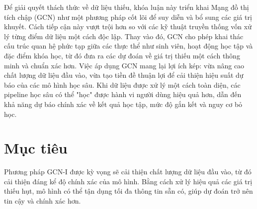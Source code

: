 Để giải quyết thách thức về dữ liệu thiếu, khóa luận này triển khai Mạng đồ thị tích chập (GCN) như một phương pháp cốt lõi để suy diễn và bổ sung các giá trị khuyết. Cách tiếp cận này vượt trội hơn so với các kỹ thuật truyền thống vốn xử lý từng điểm dữ liệu một cách độc lập. Thay vào đó, GCN cho phép khai thác cấu trúc quan hệ phức tạp giữa các thực thể như sinh viên, hoạt động học tập và đặc điểm khóa học, từ đó đưa ra các dự đoán về giá trị thiếu một cách thông minh và chuẩn xác hơn. Việc áp dụng GCN mang lại lợi ích kép: vừa nâng cao chất lượng dữ liệu đầu vào, vừa tạo tiền đề thuận lợi để cải thiện hiệu suất dự báo của các mô hình học sâu. Khi dữ liệu được xử lý một cách toàn diện, các pipeline học sâu có thể "học" được hành vi người dùng hiệu quả hơn, dẫn đến khả năng dự báo chính xác về kết quả học tập, mức độ gắn kết và nguy cơ bỏ học.


\section{Mục tiêu}

 Phương pháp GCN-I được kỳ vọng sẽ cải thiện chất lượng dữ liệu đầu vào, từ đó cải thiện đáng kể độ chính xác của mô hình. Bằng cách xử lý hiệu quả các giá trị thiếu hụt, mô hình có thể tận dụng tối đa thông tin sẵn có, giúp dự đoán trở nên tin cậy và chính xác hơn.

